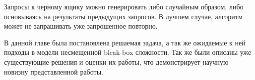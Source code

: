 Запросы к черному ящику можно генерировать либо случайным образом, либо основываясь на результаты предыдущих запросов. В лучшем случае, алгоритм может не запрашивать уже запрошенное повторно.


\chapterconclusion

В данной главе была постановлена решаемая задача, а так же ожидаемые к ней подходы в модели несмещенной blcak-box сложности. Так же были описаны уже существующие решения и оценки их работы, что демонстрирует научную новизну представленной работы. 



